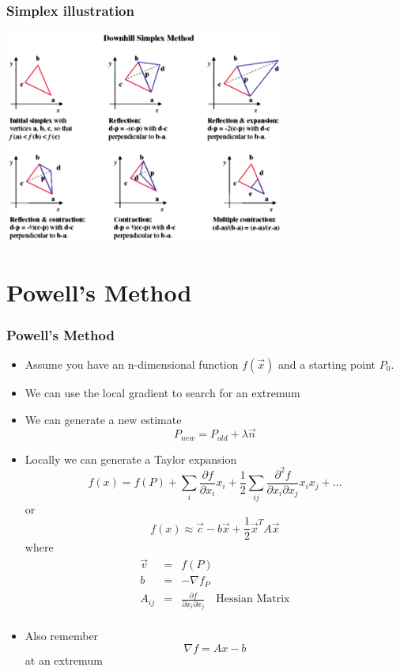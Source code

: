 \documentclass[10pt]{beamer}
\begin{document}
\begin{frame}
  \frametitle{Simplex illustration}
  \centerline{\includegraphics[height=7cm]{simplex}}
\end{frame}

\section{Powell's Method}
\label{sec:powells-method}

\begin{frame}
  \frametitle{Powell's Method}
  \begin{itemize}
  \item Assume you have an n-dimensional function $f(\vec{x})$ and a starting point $P_0$. 
  \item We can use the local gradient to search for an extremum
  \item We can generate a new estimate
    \[
      P_{new} = P_{old} + \lambda \vec{n}
    \]
  \item Locally we can generate a Taylor expansion
    \[
      f(x) = f(P) + \sum_i \frac{\partial f}{\partial x_i} x_i + \frac{1}{2} \sum_{ij} \frac{\partial^2f}{\partial x_i \partial x_j} x_i x_j + \ldots
    \] or 
    \[
      f(x) \approx \vec{c} - b \vec{x} + \frac{1}{2} \vec{x}^T A \vec{x}
    \] where
    \[
      \begin{array}{ccc}
        \vec{v} &= & f(P)\\
        b & = & - \nabla f_P \\
        A_{ij} & = & \frac{\partial f}{\partial x_i \partial x_j} \mbox{~~ Hessian Matrix} \\
      \end{array}
    \] 
  \item Also remember
    \[ \nabla f = A x - b \]
    at an extremum
  \end{itemize}
\end{frame}
\end{document}
